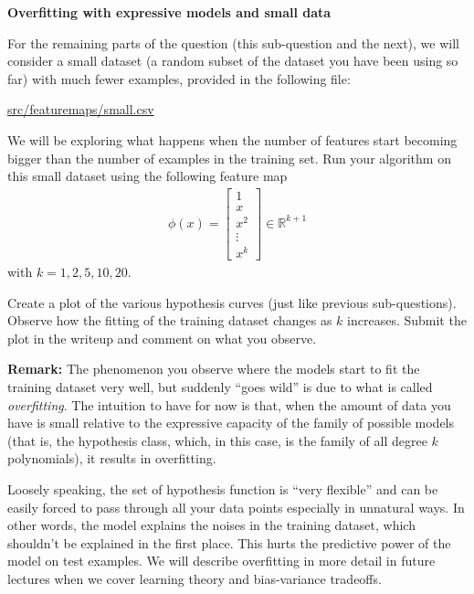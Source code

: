 \item {} {\bf Overfitting with expressive models and small data}

For the remaining parts of the question (this sub-question and the next), we will consider a small
dataset (a random subset of the dataset you have been using so far) with much fewer examples, provided in
the following file:
%
\begin{center}
	\url{src/featuremaps/small.csv}
\end{center}
%

We will be exploring what happens when the number of features start becoming bigger than the number of 
examples in the training set. Run your algorithm on this small dataset using the following feature map 
\begin{align}
\phi(x) = \left[\begin{array}{c} 1\\ x \\ x^2\\ \vdots \\x^k \end{array}\right]\in \mathbb{R}^{k+1} 
\end{align}
with $k = 1,2,5,10,20$. 

Create a plot of the various hypothesis curves (just like previous sub-questions). Observe how the fitting of the training dataset changes as $k$ increases. Submit the plot in the writeup and comment on what you observe.

\textbf{Remark: } The phenomenon you observe where the models start to fit the training dataset very well, but suddenly ``goes wild'' is due to what is called \emph{overfitting}. The intuition to have for now is that, when the amount of data you have is small relative to the expressive capacity of the family of possible models (that is, the hypothesis class, which, in this case, is the family of all degree $k$ polynomials), it results in overfitting.  

Loosely speaking, the set of hypothesis function is ``very flexible'' and can be easily forced to pass through all your data points especially in unnatural ways. In other words, the  model explains the noises in the training dataset, which shouldn't be explained in the first place. This hurts the predictive power of the model on test examples. We will describe overfitting in more detail in future lectures when we cover learning theory and bias-variance tradeoffs.

